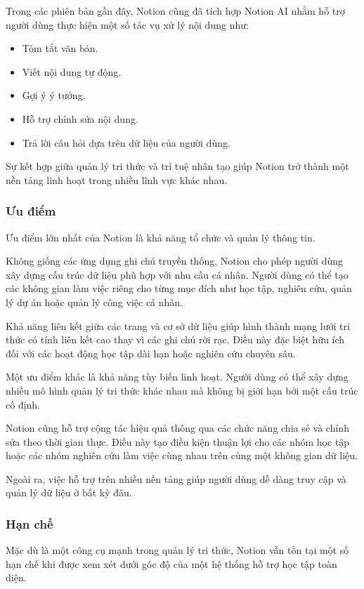 Trong các phiên bản gần đây, Notion cũng đã tích hợp Notion AI nhằm hỗ trợ người dùng thực hiện một số tác vụ xử lý nội dung \cite{notionAI} như:
\begin{itemize}
    \item Tóm tắt văn bản.
    \item Viết nội dung tự động.
    \item Gợi ý ý tưởng.
    \item Hỗ trợ chỉnh sửa nội dung.
    \item Trả lời câu hỏi dựa trên dữ liệu của người dùng.
\end{itemize}

Sự kết hợp giữa quản lý tri thức và trí tuệ nhân tạo giúp Notion trở thành một nền tảng linh hoạt trong nhiều lĩnh vực khác nhau.

\subsubsection{Ưu điểm}
Ưu điểm lớn nhất của Notion là khả năng tổ chức và quản lý thông tin.

Không giống các ứng dụng ghi chú truyền thống, Notion cho phép người dùng xây dựng cấu trúc dữ liệu phù hợp với nhu cầu cá nhân. Người dùng có thể tạo các không gian làm việc riêng cho từng mục đích như học tập, nghiên cứu, quản lý dự án hoặc quản lý công việc cá nhân.

Khả năng liên kết giữa các trang và cơ sở dữ liệu giúp hình thành mạng lưới tri thức có tính liên kết cao thay vì các ghi chú rời rạc. Điều này đặc biệt hữu ích đối với các hoạt động học tập dài hạn hoặc nghiên cứu chuyên sâu.

Một ưu điểm khác là khả năng tùy biến linh hoạt. Người dùng có thể xây dựng nhiều mô hình quản lý tri thức khác nhau mà không bị giới hạn bởi một cấu trúc cố định.

Notion cũng hỗ trợ cộng tác hiệu quả thông qua các chức năng chia sẻ và chỉnh sửa theo thời gian thực. Điều này tạo điều kiện thuận lợi cho các nhóm học tập hoặc các nhóm nghiên cứu làm việc cùng nhau trên cùng một không gian dữ liệu.

Ngoài ra, việc hỗ trợ trên nhiều nền tảng giúp người dùng dễ dàng truy cập và quản lý dữ liệu ở bất kỳ đâu.

\subsubsection{Hạn chế}

Mặc dù là một công cụ mạnh trong quản lý tri thức, Notion vẫn tồn tại một số hạn chế khi được xem xét dưới góc độ của một hệ thống hỗ trợ học tập toàn diện.

